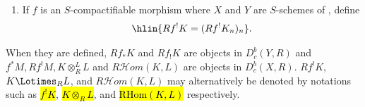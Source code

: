 \begin{definition}
\begin{enumerate}
        \item If $f$ is an $S$-compactifiable morphism where $X$ and $Y$ are $S$-schemes of , define
        $$\hlin{Rf^! K = (Rf^! K_n)_n}.$$
    \end{enumerate}




    When they are defined, $Rf_* K$ and $Rf_! K$ are objects in $D_c^b(Y,R)$ and $f^* M, Rf^! M, K \otimes_R^L L$ and $R\mathscr{H}om(K,L)$ are objects in $D_c^b(X,R)$.
    $Rf^! K$, $K \Lotimes_R L$, and $R\mathscr{H}om(K,L)$ may alternatively be denoted by notations such as \hl{$f^! K$}, \hl{$K \otimes_R L$}, and \hl{$\mathrm{RHom}(K,L)$} respectively.
\end{definition}